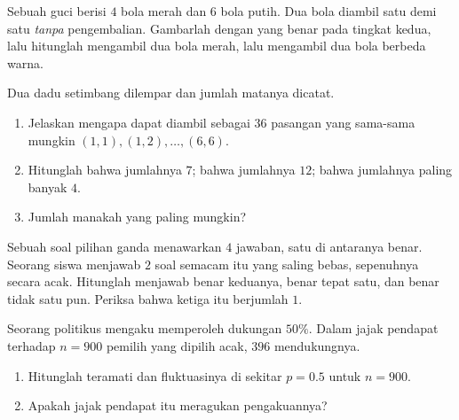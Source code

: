 \begin{exercise}[$\star\star$]\label{exo:g10:proba:5}
Sebuah guci berisi $4$ bola merah dan $6$ bola putih. Dua bola diambil satu
demi satu \emph{tanpa} pengembalian. Gambarlah  dengan
 yang benar pada tingkat kedua, lalu hitunglah  mengambil
dua bola merah, lalu  mengambil dua bola berbeda warna.
\end{exercise}

\begin{exercise}[$\star\star$]\label{exo:g10:proba:6}
Dua dadu setimbang dilempar dan jumlah matanya dicatat.
\begin{enumerate}
  \item Jelaskan mengapa  dapat diambil sebagai $36$ pasangan
        yang sama-sama mungkin $(1,1), (1,2), \dots, (6,6)$.
  \item Hitunglah  bahwa jumlahnya $7$; bahwa jumlahnya $12$;
        bahwa jumlahnya paling banyak $4$.
  \item Jumlah manakah yang paling mungkin?
\end{enumerate}
\end{exercise}

\begin{exercise}[$\star\star$]\label{exo:g10:proba:7}
Sebuah soal pilihan ganda menawarkan $4$ jawaban, satu di antaranya benar.
Seorang siswa menjawab $2$ soal semacam itu yang saling bebas, sepenuhnya
secara acak. Hitunglah  menjawab benar keduanya, benar tepat satu, dan
benar tidak satu pun. Periksa bahwa ketiga  itu berjumlah $1$.
\end{exercise}

\begin{exercise}[$\star\star$]\label{exo:g10:proba:8}
Seorang politikus mengaku memperoleh dukungan $50\%$. Dalam jajak pendapat
terhadap $n = 900$ pemilih yang dipilih acak, $396$ mendukungnya.
\begin{enumerate}
  \item Hitunglah  teramati dan  fluktuasinya
        di sekitar $p = 0.5$ untuk $n = 900$.
  \item Apakah jajak pendapat itu meragukan pengakuannya?
\end{enumerate}
\end{exercise}

